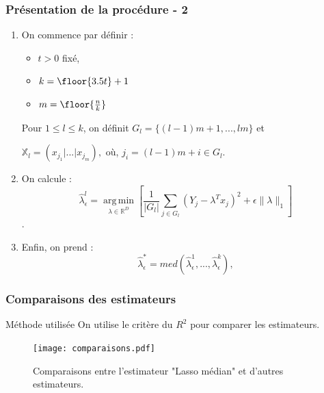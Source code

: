 \documentclass[unknownkeysallowed]{beamer}
\DeclareMathOperator*{\argmin}{arg\,min}
\begin{document}
\begin{frame}
\frametitle{Présentation de la procédure - 2}
\begin{enumerate}
    \item On commence par définir : 
    \begin{itemize}
        \item $t > 0$ fixé, 
        \item $k = \floor{3.5t} + 1$
        \item $m = \floor{\frac{n}{k}}$
    \end{itemize}
    Pour $1 \leq l \leq k$, on définit $G_l = \{(l-1)m + 1, ..., lm \}$ et 
\begin{center}
    $\mathbb{X}_l = (x_{j_1} | ... | x_{j_m}),$ où,  $j_i = (l - 1)m + i \in G_l$.
\end{center}
    \item On calcule :
    $$\hat{\lambda}_\epsilon^l = \argmin\limits_{\lambda \in \mathbb{R}^D} \left[ \frac{1}{|G_l|} \sum\limits_{j \in G_l} (Y_j - \lambda^T x_j)^2 + \epsilon \|\lambda\|_1 \right]$$.
    \item Enfin, on prend :
    $$\hat{\lambda}_\epsilon^* = med(\hat{\lambda}_\epsilon^1, ..., \hat{\lambda}_\epsilon^k),$$
\end{enumerate}
\end{frame}

\begin{frame}
\frametitle{Comparaisons des estimateurs}
\begin{block}{Méthode utilisée}
On utilise le critère du $R^2$ pour comparer les estimateurs.
\end{block}
\begin{figure}[!h]
    \begin{center}
     \caption{\label{étiquette}Comparaisons entre l'estimateur "Lasso médian" et d'autres estimateurs.}
   \texttt{[image: comparaisons.pdf]}
   \end{center}
    \end{figure}

\end{frame}

\end{document}
